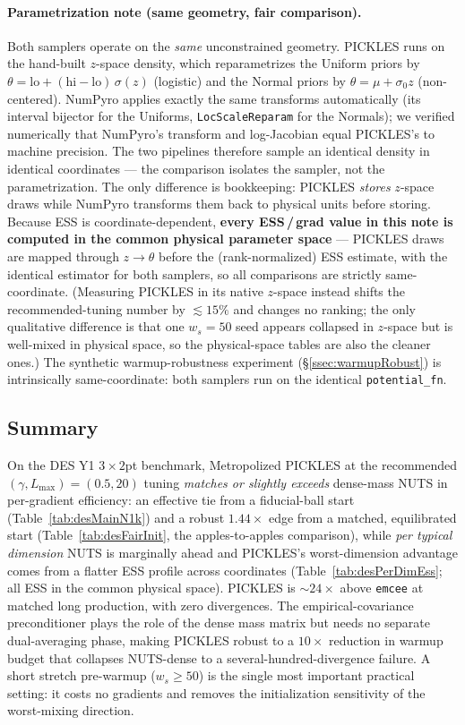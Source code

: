 \documentclass{article}
\begin{document}
\paragraph{Parametrization note (same geometry, fair comparison).} Both
samplers operate on the \emph{same} unconstrained geometry. PICKLES runs
on the hand-built $z$-space density, which reparametrizes the Uniform
priors by $\theta = \text{lo} + (\text{hi}{-}\text{lo})\,\sigma(z)$
(logistic) and the Normal priors by $\theta = \mu + \sigma_0 z$
(non-centered). NumPyro applies exactly the same transforms automatically
(its interval bijector for the Uniforms, \texttt{LocScaleReparam} for the
Normals); we verified numerically that NumPyro's transform and
log-Jacobian equal PICKLES's to machine precision. The two pipelines
therefore sample an identical density in identical coordinates --- the
comparison isolates the sampler, not the parametrization. The only
difference is bookkeeping: PICKLES \emph{stores} $z$-space draws while
NumPyro transforms them back to physical units before storing. Because
ESS is coordinate-dependent, \textbf{every ESS\,/\,grad value in this
note is computed in the common physical parameter space} --- PICKLES
draws are mapped through $z\!\to\!\theta$ before the (rank-normalized)
ESS estimate, with the identical estimator for both samplers, so all
comparisons are strictly same-coordinate. (Measuring PICKLES in its
native $z$-space instead shifts the recommended-tuning number by
$\lesssim\!15\%$ and changes no ranking; the only qualitative difference
is that one $w_s{=}50$ seed appears collapsed in $z$-space but is
well-mixed in physical space, so the physical-space tables are also the
cleaner ones.) The synthetic warmup-robustness experiment
(\S\ref{ssec:warmupRobust}) is intrinsically same-coordinate: both
samplers run on the identical \texttt{potential\_fn}.

\subsection{Summary}

On the DES Y1 $3\times 2$pt benchmark, Metropolized PICKLES at the
recommended $(\gamma,L_{\max})=(0.5,20)$ tuning \emph{matches or slightly
exceeds} dense-mass NUTS in per-gradient efficiency: an effective tie
from a fiducial-ball start (Table~\ref{tab:desMainN1k}) and a robust
$1.44\times$ edge from a matched, equilibrated start
(Table~\ref{tab:desFairInit}, the apples-to-apples comparison), while
\emph{per typical dimension} NUTS is marginally ahead and PICKLES's
worst-dimension advantage comes from a flatter ESS profile across
coordinates (Table~\ref{tab:desPerDimEss}; all ESS in the common physical
space). PICKLES is $\sim\!24\times$ above \texttt{emcee} at matched long
production, with zero divergences. The empirical-covariance
preconditioner plays the role of the dense mass matrix but needs no
separate dual-averaging phase, making PICKLES robust to a $10\times$
reduction in warmup budget that collapses NUTS-dense to a
several-hundred-divergence failure. A short stretch pre-warmup
($w_s\!\ge\!50$) is the single most important practical setting: it
costs no gradients and removes the initialization sensitivity of the
worst-mixing direction.
\end{document}
